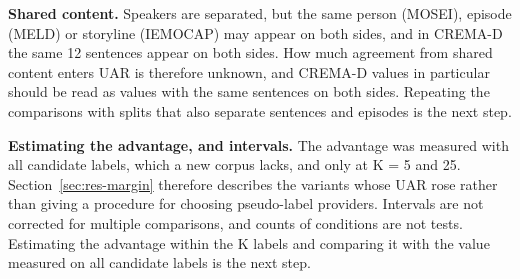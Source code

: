 \textbf{Shared content.} Speakers are separated, but the same person (MOSEI), episode (MELD) or storyline (IEMOCAP) may appear on both sides, and in CREMA-D the same 12 sentences appear on both sides. How much agreement from shared content enters UAR is therefore unknown, and CREMA-D values in particular should be read as values with the same sentences on both sides. Repeating the comparisons with splits that also separate sentences and episodes is the next step.

\textbf{Estimating the advantage, and intervals.} The advantage was measured with all candidate labels, which a new corpus lacks, and only at K = 5 and 25. Section~\ref{sec:res-margin} therefore describes the variants whose UAR rose rather than giving a procedure for choosing pseudo-label providers. Intervals are not corrected for multiple comparisons, and counts of conditions are not tests. Estimating the advantage within the K labels and comparing it with the value measured on all candidate labels is the next step.
